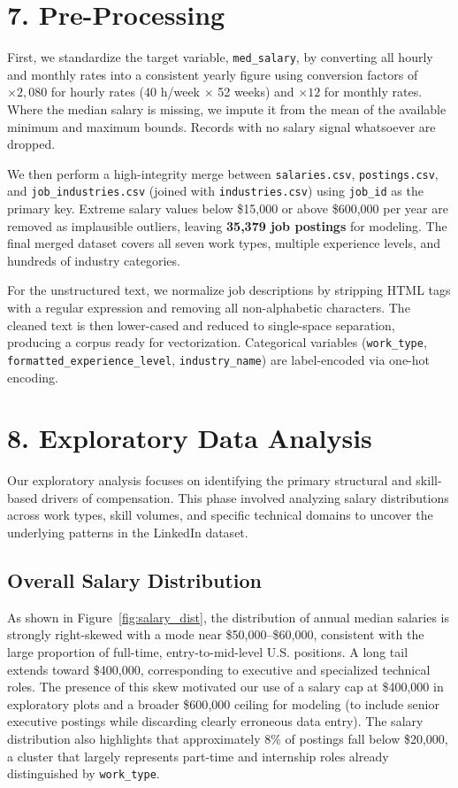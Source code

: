 \documentclass[11pt]{article}
\begin{document}
\section*{7. Pre-Processing}
First, we standardize the target variable, \texttt{med\_salary}, by converting all hourly and monthly rates into a consistent yearly figure using conversion factors of $\times 2{,}080$ for hourly rates (40 h/week $\times$ 52 weeks) and $\times 12$ for monthly rates. Where the median salary is missing, we impute it from the mean of the available minimum and maximum bounds. Records with no salary signal whatsoever are dropped.

We then perform a high-integrity merge between \texttt{salaries.csv}, \texttt{postings.csv}, and \texttt{job\_industries.csv} (joined with \texttt{industries.csv}) using \texttt{job\_id} as the primary key. Extreme salary values below \$15{,}000 or above \$600{,}000 per year are removed as implausible outliers, leaving \textbf{35,379 job postings} for modeling. The final merged dataset covers all seven work types, multiple experience levels, and hundreds of industry categories.

For the unstructured text, we normalize job descriptions by stripping HTML tags with a regular expression and removing all non-alphabetic characters. The cleaned text is then lower-cased and reduced to single-space separation, producing a corpus ready for vectorization. Categorical variables (\texttt{work\_type}, \texttt{formatted\_experience\_level}, \texttt{industry\_name}) are label-encoded via one-hot encoding.

\section*{8. Exploratory Data Analysis}
Our exploratory analysis focuses on identifying the primary structural and skill-based drivers of compensation. This phase involved analyzing salary distributions across work types, skill volumes, and specific technical domains to uncover the underlying patterns in the LinkedIn dataset.

\subsection*{Overall Salary Distribution}
As shown in Figure~\ref{fig:salary_dist}, the distribution of annual median salaries is strongly right-skewed with a mode near \$50{,}000--\$60{,}000, consistent with the large proportion of full-time, entry-to-mid-level U.S. positions. A long tail extends toward \$400{,}000, corresponding to executive and specialized technical roles. The presence of this skew motivated our use of a salary cap at \$400{,}000 in exploratory plots and a broader \$600{,}000 ceiling for modeling (to include senior executive postings while discarding clearly erroneous data entry). The salary distribution also highlights that approximately 8\% of postings fall below \$20{,}000, a cluster that largely represents part-time and internship roles already distinguished by \texttt{work\_type}.
\end{document}
